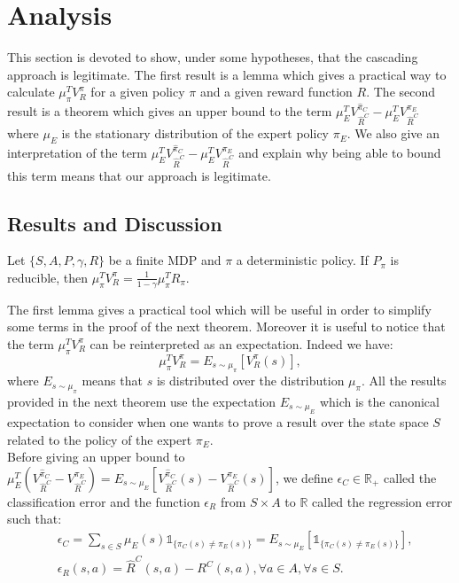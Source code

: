 \documentclass{llncs}
\newcommand{\0}{\mathbf{0}}
\newcommand{\1}{\mathbf{1}}
\begin{document}
\section{Analysis} \label{section: Analysis}
This section is devoted to show, under some hypotheses, that the cascading approach is legitimate. The first result is a lemma which gives a practical way to calculate $\mu_\pi^TV^{\pi}_R$ for a given policy $\pi$ and a given reward function $R$. The second result is a theorem which gives an upper bound to the term $\mu_E^TV^{\hat{\pi}_C}_{\hat{R}^C}-\mu_E^TV^{\pi_E}_{\hat{R}^C}$ where $\mu_E$ is the stationary distribution of the expert policy $\pi_E$. We also give an interpretation of the term $\mu_E^TV^{\hat{\pi}_C}_{\hat{R}^C}-\mu_E^TV^{\pi_E}_{\hat{R}^C}$ and explain why being able to bound this term means that our approach is legitimate.
\subsection{Results and Discussion}
\begin{lemma}
\label{lemma: calculs V}
Let $\{S,A,P,\gamma,R\}$ be a finite MDP and $\pi$ a deterministic policy.
If $P_\pi$ is reducible, then $\mu_\pi^TV^\pi_R=\frac{1}{1-\gamma}\mu_\pi^TR_\pi$.
\end{lemma}
The first lemma gives a practical tool which will be useful in order to simplify some terms in the proof of the next theorem. Moreover it is useful
to notice that the term  $\mu_\pi^TV^\pi_R$ can be reinterpreted as an expectation. Indeed we have:
\begin{equation}
\mu_\pi^TV^\pi_R=E_{s \sim \mu_\pi}[V^\pi_R(s)],
\end{equation}
where $E_{s \sim \mu_\pi}$ means that $s$ is distributed over the distribution $\mu_\pi$. All the results provided in the next theorem use the expectation $E_{s \sim \mu_E}$ which is the canonical expectation
to consider when one wants to prove a result over the state space $S$ related to the policy of the expert $\pi_E$.\\
Before giving an upper bound to $\mu_E^T(V^{\hat{\pi}_C}_{\hat{R}^C}-V^{\pi_E}_{\hat{R}^C})=E_{s \sim \mu_E}[V^{\hat{\pi}_C}_{\hat{R}^C}(s)-V^{\pi_E}_{\hat{R}^C}(s)]$, we define $\epsilon_C\in\mathbb{R}_+$ called the classification error and the function $\epsilon_R$ from $S\times A$ to $\mathbb{R}$ called the regression error such that:
\begin{align}
&\epsilon_C=\sum_{s\in S}\mu_{E}(s)\mathds{1}_{\{\pi_C(s)\neq\pi_E(s)\}}=E_{s \sim \mu_E}[\mathds{1}_{\{\pi_C(s)\neq\pi_E(s)\}}],
\\
&\epsilon_R(s,a)=\hat{R}^C(s,a)-R^C(s,a), \forall a\in A, \forall s\in S.
\end{align}
\end{document}
